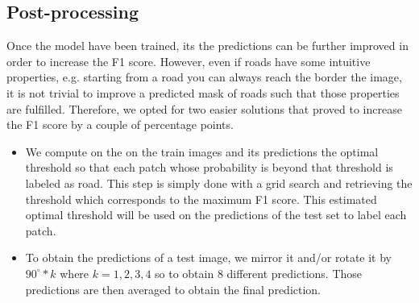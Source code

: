 \documentclass[10pt,conference,compsocconf]{IEEEtran}
\begin{document}
\subsection{Post-processing}
Once the model have been trained, its the predictions can be further improved in order to increase the F1 score. However, even if roads have some intuitive properties, e.g. starting from a road you can always reach the border the image, it is not trivial to improve a predicted mask of roads such that those properties are fulfilled. Therefore, we opted for two easier solutions that proved to increase the F1 score by a couple of percentage points.
\begin{itemize}
	\item We compute on the on the train images and its predictions the optimal threshold so that each patch whose probability is beyond that threshold is labeled as road. This step is simply done with a grid search and retrieving the threshold which corresponds to the maximum F1 score. This estimated optimal threshold will be used on the predictions of the test set to label each patch.
	\item To obtain the predictions of a test image, we mirror it and/or rotate it by $90^\circ*k$ where $k=1,2,3,4$ so to obtain 8 different predictions. Those predictions are then averaged to obtain the final prediction.
\end{itemize}

%
%
%
%
%
\end{document}
